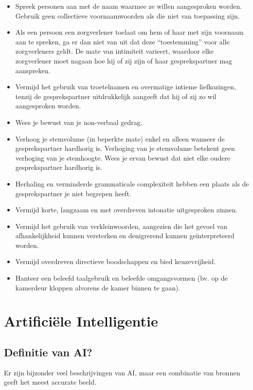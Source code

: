 {\begin{itemize}
    \item Spreek personen aan met de naam waarmee ze willen aangesproken worden. Gebruik geen collectieve voornaamwoorden als die niet van toepassing zijn.
    \item Als een persoon een zorgverlener toelaat om hem of haar met zijn voornaam aan te spreken, ga er dan niet van uit dat deze “toestemming” voor alle zorgverleners geldt. De mate van intimiteit varieert, waardoor elke zorgverlener moet nagaan hoe hij of zij zijn of haar gesprekspartner mag aanspreken.
    \item Vermijd het gebruik van troetelnamen en overmatige intieme liefkozingen, tenzij de gesprekspartner uitdrukkelijk aangeeft dat hij of zij zo wil aangesproken worden.
    \item Wees je bewust van je non-verbaal gedrag.
    \item Verhoog je stemvolume (in beperkte mate) enkel en alleen wanneer de gesprekspartner hardhorig is. Verhoging van je stemvolume betekent geen verhoging van je stemhoogte. Wees je ervan bewust dat niet elke oudere gesprekspartner hardhorig is.
    \item Herhaling en verminderde grammaticale complexiteit hebben een plaats als de gesprekspartner je niet begrepen heeft.
    \item Vermijd korte, langzaam en met overdreven intonatie uitgesproken zinnen.
    \item Vermijd het gebruik van verkleinwoorden, aangezien die het gevoel van afhankelijkheid kunnen versterken en denigrerend kunnen geïnterpreteerd worden.
    \item Vermijd overdreven directieve boodschappen en bied keuzevrijheid.
    \item Hanteer een beleefd taalgebruik en beleefde omgangsvormen (bv. op de kamerdeur kloppen alvorens de kamer binnen te gaan).
\end{itemize}

\clearpage

\section{Artificiële Intelligentie}
\subsection{Definitie van AI?}
Er zijn bijzonder veel beschrijvingen van AI, maar een combinatie van bronnen geeft het meest accurate beeld.

}
